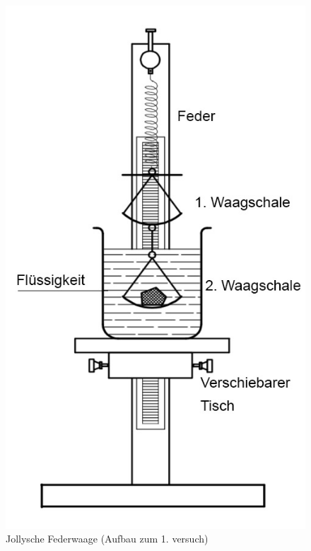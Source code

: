 \documentclass[11pt,a4paper]{article} %
\begin{document}
\begin{figure}
	\centering
	\includegraphics[scale=0.5]{Abb1}
	\caption { Jollysche Federwaage
		       (Aufbau zum 1. versuch) }
	               

\end{figure}
\end{document}
